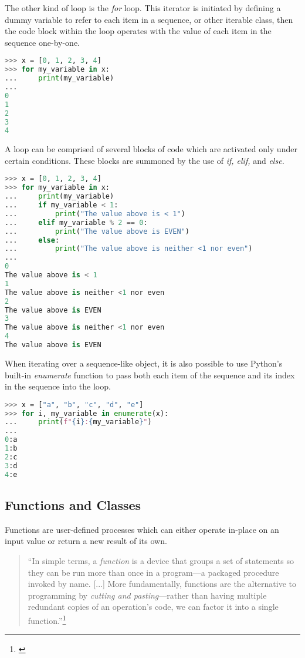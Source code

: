 The other kind of loop is the \textit{for} loop. This iterator is initiated by defining a dummy variable to refer to each item in a sequence, or other iterable class, then the code block within the loop operates with the value of each item in the sequence one-by-one.

\begin{lstlisting}[language=Python,frame=tb,caption={A simple for loop},label=lst:for]
>>> x = [0, 1, 2, 3, 4]
>>> for my_variable in x:
...     print(my_variable)
... 
0
1
2
3
4
\end{lstlisting}

A loop can be comprised of several blocks of code which are activated only under certain conditions. These blocks are summoned by the use of \textit{if, elif,} and \textit{else.}

\begin{lstlisting}[language=Python,frame=tb,caption={A simple for loop with conditional blocks},label=lst:for-conditional]
>>> x = [0, 1, 2, 3, 4]
>>> for my_variable in x:
...     print(my_variable)
...     if my_variable < 1:
...         print("The value above is < 1")
...     elif my_variable % 2 == 0:
...         print("The value above is EVEN")
...     else:
...         print("The value above is neither <1 nor even")
... 
0
The value above is < 1
1
The value above is neither <1 nor even
2
The value above is EVEN
3
The value above is neither <1 nor even
4
The value above is EVEN
\end{lstlisting}

When iterating over a sequence-like object, it is also possible to use Python's built-in \textit{enumerate} function to pass both each item of the sequence and its index in the sequence into the loop.

\begin{lstlisting}[language=Python,frame=tb,caption={Enumeration},label=lst:enumerate]
>>> x = ["a", "b", "c", "d", "e"]
>>> for i, my_variable in enumerate(x):
...     print(f"{i}:{my_variable}")
... 
0:a
1:b
2:c
3:d
4:e
\end{lstlisting}

\subsection{Functions and Classes}

Functions are user-defined processes which can either operate in-place on an input value or return a new result of its own. 

\begin{quote}
\singlespacing
``In simple terms, a \textit{function} is a device that groups a set of statements so they can be run more than once in a program—a packaged procedure invoked by name. [...] More fundamentally, functions are the alternative to programming by \textit{cutting and pasting}—rather than having multiple redundant copies of an operation's code, we can factor it into a single function.''\footnote{\citet[491]{pythonbook}}
\end{quote}

